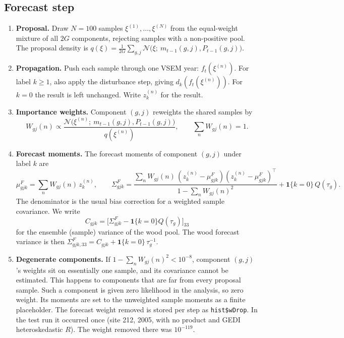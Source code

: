 \documentclass[11pt]{article}
\newcommand{\Norm}{\mathcal{N}}
\newcommand{\code}[1]{\texttt{#1}}
\begin{document}
\subsection{Forecast step}

\begin{enumerate}
  \item \textbf{Proposal.} Draw $N = 100$ samples $\xi^{(1)},\dots,\xi^{(N)}$ from the
  equal-weight mixture of all $2G$ components, rejecting samples with a non-positive pool.
  The proposal density is
  $q(\xi) = \frac{1}{2G}\sum_{g,j}\Norm\big(\xi;\ m_{t-1}(g,j), P_{t-1}(g,j)\big)$.
  \item \textbf{Propagation.} Push each sample through one VSEM year: $f_t(\xi^{(n)})$. For
  label $k \ge 1$, also apply the disturbance step, giving $d_k(f_t(\xi^{(n)}))$. For
  $k = 0$ the result is left unchanged. Write $z^{(n)}_k$ for the result.
  \item \textbf{Importance weights.} Component $(g,j)$ reweights the shared samples by
  \[
    W_{gj}(n) \propto \frac{\Norm\big(\xi^{(n)};\ m_{t-1}(g,j), P_{t-1}(g,j)\big)}{q(\xi^{(n)})},
    \qquad \sum_n W_{gj}(n) = 1 .
  \]
  \item \textbf{Forecast moments.} The forecast moments of component $(g,j)$ under label
  $k$ are
  \[
    \mu^F_{gjk} = \sum_n W_{gj}(n)\, z^{(n)}_k, \qquad
    \Sigma^F_{gjk} = \frac{\sum_n W_{gj}(n)\,(z^{(n)}_k - \mu^F_{gjk})(z^{(n)}_k - \mu^F_{gjk})^\top}
                         {1 - \sum_n W_{gj}(n)^2}
                   + \mathbf{1}\{k = 0\}\, Q(\tau_g).
  \]
  The denominator is the usual bias correction for a weighted sample covariance. We write
  \[
    C_{gjk} = \big[\Sigma^F_{gjk} - \mathbf{1}\{k=0\}Q(\tau_g)\big]_{33}
  \]
  for the ensemble (sample) variance of the wood pool. The wood forecast variance is then
  $\Sigma^F_{gjk,33} = C_{gjk} + \mathbf{1}\{k = 0\}\,\tau_g^{-1}$.
  \item \textbf{Degenerate components.} If $1 - \sum_n W_{gj}(n)^2 < 10^{-8}$, component
  $(g,j)$'s weights sit on essentially one sample, and its covariance cannot be estimated.
  This happens to components that are far from every proposal sample. Such a component
  is given zero likelihood in the analysis, so zero weight. Its moments are set to the
  unweighted sample moments as a finite placeholder. The forecast weight removed is
  stored per step as \code{hist\$wDrop}. In the test run it occurred once (site 212,
  2005, with no product and GEDI heteroskedastic $R$). The weight removed there was
  $10^{-119}$.
\end{enumerate}
\end{document}
